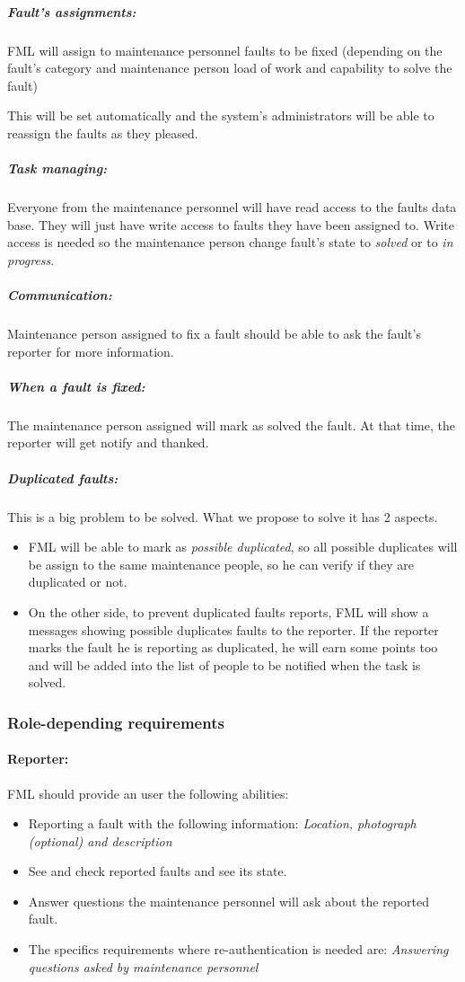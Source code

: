 \documentclass{report}
\begin{document}
\subparagraph{Fault's assignments: } FML will assign to maintenance personnel faults to be fixed (depending on the fault's category and maintenance person load of work and capability to solve the fault)

This will be set automatically and the system's administrators will be able to reassign the faults as they pleased.

\subparagraph{Task managing: } Everyone from the maintenance personnel will have read access to the faults data base. They will just have write access to faults they have been assigned to. Write access is needed so the maintenance person change fault's state to \textit{solved} or to \textit{in progress}.

\subparagraph{Communication: } Maintenance person assigned to fix a fault should be able to ask the fault's reporter for more information.

\subparagraph{When a fault is fixed: } The maintenance person assigned will mark as solved the fault. At that time, the reporter will get notify and thanked.

\subparagraph{Duplicated faults: } This is a big problem to be solved. What we propose to solve it has 2 aspects.
\begin{itemize}
\item FML will be able to mark as \textit{possible duplicated}, so all possible duplicates will be assign to the same maintenance people, so he can verify if they are duplicated or not.

\item On the other side, to prevent duplicated faults reports, FML will show a messages showing possible duplicates faults to the reporter. If the reporter marks the fault he is reporting as duplicated, he will earn some points too and will be added into the list of people to be notified when the task is solved.
\end{itemize}

\subsubsection{Role-depending requirements}

\paragraph{Reporter: } FML should provide an user the following abilities:
\begin{itemize}
\item Reporting a fault with the following information: \textit{Location, photograph (optional) and description}
\item See and check reported faults and see its state.
\item Answer questions the maintenance personnel will ask about the reported fault.
\item The specifics requirements where re-authentication is needed are: \textit{Answering questions asked by maintenance personnel}   \label{Specifics_Secure_Requirements_for_user}
\end{itemize}
\end{document}
